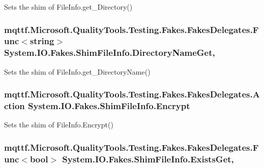 Sets the shim of File\-Info.\-get\-\_\-\-Directory()

\hypertarget{class_system_1_1_i_o_1_1_fakes_1_1_shim_file_info_ad1ac2244fd6b0522af459d902db2572e}{
\subsubsection[{Directory\-Name\-Get}]{\setlength{\rightskip}{0pt plus 5cm}mqttf.\-Microsoft.\-Quality\-Tools.\-Testing.\-Fakes.\-Fakes\-Delegates.\-Func$<$string$>$ System.\-I\-O.\-Fakes.\-Shim\-File\-Info.\-Directory\-Name\-Get\hspace{0.3cm}{\ttfamily [get]}, {\ttfamily [set]}}}\label{class_system_1_1_i_o_1_1_fakes_1_1_shim_file_info_ad1ac2244fd6b0522af459d902db2572e}


Sets the shim of File\-Info.\-get\-\_\-\-Directory\-Name()

\hypertarget{class_system_1_1_i_o_1_1_fakes_1_1_shim_file_info_a4a4410662b11deb0f511fcb9f18ad2dd}{
\subsubsection[{Encrypt}]{\setlength{\rightskip}{0pt plus 5cm}mqttf.\-Microsoft.\-Quality\-Tools.\-Testing.\-Fakes.\-Fakes\-Delegates.\-Action System.\-I\-O.\-Fakes.\-Shim\-File\-Info.\-Encrypt\hspace{0.3cm}{\ttfamily [set]}}}\label{class_system_1_1_i_o_1_1_fakes_1_1_shim_file_info_a4a4410662b11deb0f511fcb9f18ad2dd}


Sets the shim of File\-Info.\-Encrypt()

\hypertarget{class_system_1_1_i_o_1_1_fakes_1_1_shim_file_info_a7e95e7da3307bc8fbc147deadbb5a86d}{
\subsubsection[{Exists\-Get}]{\setlength{\rightskip}{0pt plus 5cm}mqttf.\-Microsoft.\-Quality\-Tools.\-Testing.\-Fakes.\-Fakes\-Delegates.\-Func$<$bool$>$ System.\-I\-O.\-Fakes.\-Shim\-File\-Info.\-Exists\-Get\hspace{0.3cm}{\ttfamily [get]}, {\ttfamily [set]}}}\label{class_system_1_1_i_o_1_1_fakes_1_1_shim_file_info_a7e95e7da3307bc8fbc147deadbb5a86d}


